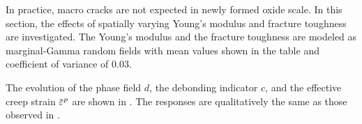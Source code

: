 In practice, macro cracks are not expected in newly formed oxide scale. In this section, the effects of spatially varying Young's modulus and fracture toughness are investigated. The Young's modulus and the fracture toughness are modeled as marginal-Gamma random fields with mean values shown in the table  and coefficient of variance of $0.03$.



The evolution of the phase field $d$, the debonding indicator $c$, and the effective creep strain $\ep$ are shown in .
The responses are qualitatively the same as those observed in .



